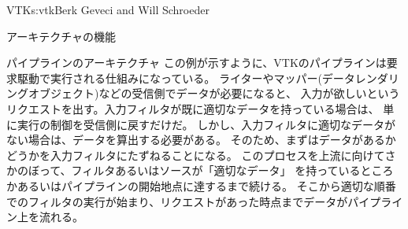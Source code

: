 \begin{aosachapter}{VTK}{s:vtk}{Berk Geveci and Will Schroeder}
\begin{aosasect1}{アーキテクチャの機能}
\begin{aosasect2}{パイプラインのアーキテクチャ}
この例が示すように、VTKのパイプラインは要求駆動で実行される仕組みになっている。
ライターやマッパー(データレンダリングオブジェクト)などの受信側でデータが必要になると、
入力が欲しいというリクエストを出す。入力フィルタが既に適切なデータを持っている場合は、
単に実行の制御を受信側に戻すだけだ。
しかし、入力フィルタに適切なデータがない場合は、データを算出する必要がある。
そのため、まずはデータがあるかどうかを入力フィルタにたずねることになる。
このプロセスを上流に向けてさかのぼって、フィルタあるいはソースが「適切なデータ」
を持っているところかあるいはパイプラインの開始地点に達するまで続ける。
そこから適切な順番でのフィルタの実行が始まり、リクエストがあった時点までデータがパイプライン上を流れる。


\end{aosasect2}
\end{aosasect1}
\end{aosachapter}
